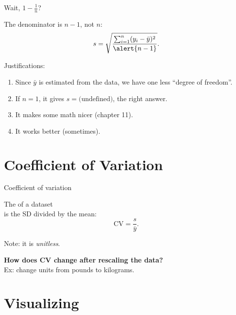 \begin{frame}{Wait, $1-\frac{1}{n}$?}

The denominator is $n-1$, not $n$:
    \[
        s = \sqrt{\frac{\sum_{i=1}^n (y_i - \bar y)^2 }{ \alert{n-1} } } .
    \]

    \vspace{3em}

    Justifications:
    \begin{enumerate}
        \item Since $\bar y$ is estimated from the data, we have one less ``degree of freedom''.
        \item If $n=1$, it gives $s=\text{(undefined)}$, the right answer.
        \item It makes some math nicer (chapter 11).
        \item It works better (sometimes).
    \end{enumerate}

\end{frame}



\section{Coefficient of Variation}



\begin{frame}{Coefficient of variation}

    The  of a dataset\\
    is the SD divided by the mean:
    \[
        \text{CV} = \frac{ s }{ \bar y } .
    \]
    \vspace{1em}

    Note: it is \emph{unitless}.

    \vspace{3em}

    \pause
    \textbf{How does CV change after rescaling the data?} \\
    Ex: change units from pounds to kilograms.

\end{frame}


\section{Visualizing}

